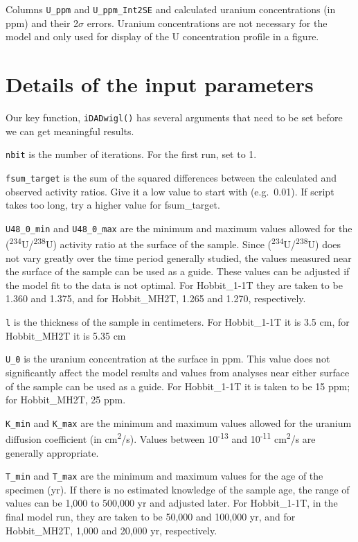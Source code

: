 \documentclass[]{elsarticle} %
\begin{document}
Columns \texttt{U\_ppm} and \texttt{U\_ppm\_Int2SE} and calculated uranium concentrations (in ppm) and their 2\(\sigma\) errors. Uranium concentrations are not necessary for the model and only used for display of the U concentration profile in a figure.

\hypertarget{details-of-the-input-parameters}{%
\section{Details of the input parameters}\label{details-of-the-input-parameters}}

Our key function, \texttt{iDADwigl()} has several arguments that need to be set before we can get meaningful results.

\texttt{nbit} is the number of iterations. For the first run, set to 1.

\texttt{fsum\_target} is the sum of the squared differences between the calculated and observed activity ratios. Give it a low value to start with (e.g.~0.01). If script takes too long, try a higher value for fsum\_target.

\texttt{U48\_0\_min} and \texttt{U48\_0\_max} are the minimum and maximum values allowed for the (\textsuperscript{234}U/\textsuperscript{238}U) activity ratio at the surface of the sample. Since (\textsuperscript{234}U/\textsuperscript{238}U) does not vary greatly over the time period generally studied, the values measured near the surface of the sample can be used as a guide. These values can be adjusted if the model fit to the data is not optimal. For Hobbit\_1-1T they are taken to be 1.360 and 1.375, and for Hobbit\_MH2T, 1.265 and 1.270, respectively.

\texttt{l} is the thickness of the sample in centimeters. For Hobbit\_1-1T it is 3.5 cm, for Hobbit\_MH2T it is 5.35 cm

\texttt{U\_0} is the uranium concentration at the surface in ppm. This value does not significantly affect the model results and values from analyses near either surface of the sample can be used as a guide. For Hobbit\_1-1T it is taken to be 15 ppm; for Hobbit\_MH2T, 25 ppm.

\texttt{K\_min} and \texttt{K\_max} are the minimum and maximum values allowed for the uranium diffusion coefficient (in cm\textsuperscript{2}/s). Values between 10\textsuperscript{-13} and 10\textsuperscript{-11} cm\textsuperscript{2}/s are generally appropriate.

\texttt{T\_min} and \texttt{T\_max} are the minimum and maximum values for the age of the specimen (yr). If there is no estimated knowledge of the sample age, the range of values can be 1,000 to 500,000 yr and adjusted later. For Hobbit\_1-1T, in the final model run, they are taken to be 50,000 and 100,000 yr, and for Hobbit\_MH2T, 1,000 and 20,000 yr, respectively.
\end{document}
